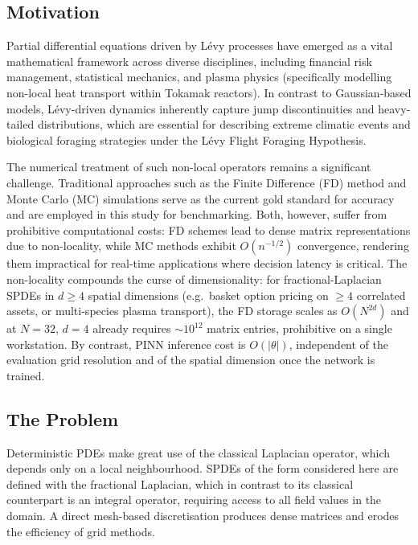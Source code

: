 \documentclass[review,12pt]{elsarticle}
\begin{document}
\subsection{Motivation}
\label{subsec:motivation}

Partial differential equations driven by L\'evy processes have emerged
as a vital mathematical framework across diverse disciplines, including
financial risk management, statistical mechanics, and plasma physics
(specifically modelling non-local heat transport within Tokamak
reactors). In contrast to Gaussian-based models, L\'evy-driven dynamics
inherently capture jump discontinuities and heavy-tailed distributions,
which are essential for describing extreme climatic events and
biological foraging strategies under the L\'evy Flight Foraging
Hypothesis.

The numerical treatment of such non-local operators remains a
significant challenge. Traditional approaches such as the Finite
Difference (FD) method and Monte Carlo (MC) simulations serve as the
current gold standard for accuracy and are employed in this study for
benchmarking. Both, however, suffer from prohibitive computational
costs: FD schemes lead to dense matrix representations due to
non-locality, while MC methods exhibit \(O(n^{-1/2})\) convergence,
rendering them impractical for real-time applications where decision
latency is critical. The non-locality compounds the curse of
dimensionality: for fractional-Laplacian SPDEs in \(d \ge 4\) spatial
dimensions (e.g.\ basket option pricing on \(\ge 4\) correlated
assets, or multi-species plasma transport), the FD storage scales as
\(O(N^{2d})\) and at \(N = 32\), \(d = 4\) already requires
\(\sim 10^{12}\) matrix entries, prohibitive on a single
workstation. By contrast, PINN inference cost is \(O(|\theta|)\),
independent of the evaluation grid resolution and of the spatial
dimension once the network is trained.

\subsection{The Problem}
\label{subsec:problem}

Deterministic PDEs make great use of the classical Laplacian operator,
which depends only on a local neighbourhood. SPDEs of the form
considered here are defined with the fractional Laplacian, which in
contrast to its classical counterpart is an integral operator,
requiring access to all field values in the domain. A direct
mesh-based discretisation produces dense matrices and erodes the
efficiency of grid methods.
\end{document}
